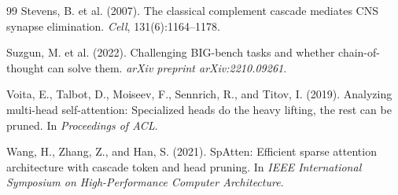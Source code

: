 \documentclass{article}
\begin{document}
{\begin{thebibliography}{99}
Stevens, B. et al. (2007).
\newblock The classical complement cascade mediates CNS synapse elimination.
\newblock \emph{Cell}, 131(6):1164--1178.

Suzgun, M. et al. (2022).
\newblock Challenging BIG-bench tasks and whether chain-of-thought can solve
them.
\newblock \emph{arXiv preprint arXiv:2210.09261}.

Voita, E., Talbot, D., Moiseev, F., Sennrich, R., and Titov, I. (2019).
\newblock Analyzing multi-head self-attention: Specialized heads do the heavy
lifting, the rest can be pruned.
\newblock In \emph{Proceedings of ACL}.

Wang, H., Zhang, Z., and Han, S. (2021).
\newblock SpAtten: Efficient sparse attention architecture with cascade token
and head pruning.
\newblock In \emph{IEEE International Symposium on High-Performance Computer
Architecture}.

\end{thebibliography}
}
\end{document}
